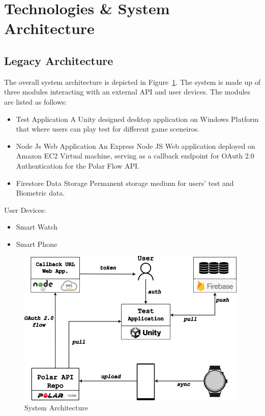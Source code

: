 \documentclass{report}
\begin{document}
    \section*{Technologies \& System Architecture}
    \subsection*{Legacy Architecture}

        The overall system architecture is depicted in Figure~\ref{fig:architecture}. The system is made up of three modules 
        interacting with an external API and user devices. The modules are listed as follows:
        \begin{itemize}
            \item{Test Application} A Unity designed desktop application on Windows Platform that where users can play test 
                for different game sceneiros.
            \item {Node Js Web Application}
                An Express Node JS Web application deployed on Amazon EC2 Virtual machine, serving as a callback endpoint for 
                OAuth 2.0 Authentication for the Polar Flow API. 
            \item {Firestore Data Storage}
                Permanent storage medium for users' test and Biometric data.
        \end{itemize}
        User Devices:
        \begin{itemize}
            \item{Smart Watch}
            \item {Smart Phone}
        \end{itemize}
        \begin{figure}[h]
        \includegraphics{images/architecture.png}
        \caption{System Architecture}
        \label{fig:architecture}
        \centering
        \end{figure}
\end{document}
